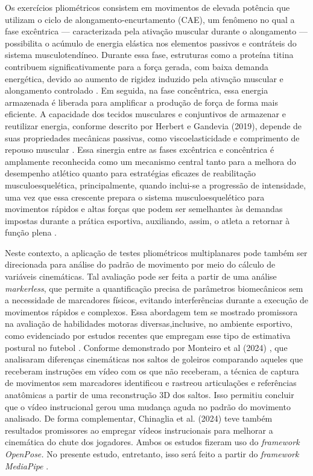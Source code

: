 \documentclass{article}
\begin{document}
Os exercícios pliométricos consistem em movimentos de elevada potência que utilizam o ciclo de alongamento-encurtamento (CAE), um fenômeno no qual a fase excêntrica — caracterizada pela ativação muscular durante o alongamento — possibilita o acúmulo de energia elástica nos elementos passivos e contráteis do sistema musculotendíneo. Durante essa fase, estruturas como a proteína titina contribuem significativamente para a força gerada, com baixa demanda energética, devido ao aumento de rigidez induzido pela ativação muscular e alongamento controlado \cite{herzog2018muscles}. Em seguida, na fase concêntrica, essa energia armazenada é liberada para amplificar a produção de força de forma mais eficiente. A capacidade dos tecidos musculares e conjuntivos de armazenar e reutilizar energia, conforme descrito por Herbert e Gandevia (2019), depende de suas propriedades mecânicas passivas, como viscoelasticidade e comprimento de repouso muscular \cite{herbert2019passive}. Essa sinergia entre as fases excêntrica e concêntrica é amplamente reconhecida como um mecanismo central tanto para a melhora do desempenho atlético quanto para estratégias eficazes de reabilitação musculoesquelética, principalmente, quando inclui-se a progressão de intensidade, uma vez que essa crescente prepara o sistema musculoesquelético para movimentos rápidos e altas forças que podem ser semelhantes às demandas impostas durante a prática esportiva, auxiliando, assim, o atleta a retornar à função plena \cite{Chmielewski2006}. 

Neste contexto, a aplicação de testes pliométricos multiplanares pode também ser direcionada para análise do padrão de movimento por meio do cálculo de variáveis cinemáticas. Tal avaliação pode ser feita a partir de uma análise \textit{markerless}, que permite a quantificação precisa de parâmetros biomecânicos sem a necessidade de marcadores físicos, evitando interferências durante a execução de movimentos rápidos e complexos. Essa abordagem tem se mostrado promissora na avaliação de habilidades motoras diversas,inclusive, no ambiente esportivo, como evidenciado por estudos recentes que empregam esse tipo de estimativa postural no futebol \cite{monteiro2024enhancing,chinaglia2024influence}. Conforme demonstrado por Monteiro et al (2024) \cite{monteiro2024enhancing}, que analisaram diferenças cinemáticas nos saltos de goleiros comparando aqueles que receberam instruções em vídeo com os que não receberam, a técnica de captura de movimentos sem marcadores identificou e rastreou articulações e referências anatômicas a partir de uma reconstrução 3D dos saltos. Isso permitiu concluir que o vídeo instrucional gerou uma mudança aguda no padrão do movimento analisado. De forma complementar, Chinaglia et al. (2024) \cite{chinaglia2024influence} teve também resultados promissores ao empregar vídeos instrucionais para melhorar a cinemática do chute dos jogadores. Ambos os estudos fizeram uso do \textit{framework OpenPose.} No presente estudo, entretanto, isso será feito a partir do \textit{framework \textit{MediaPipe}} \cite{lugaresi2019mediapipe}. 
\end{document}
